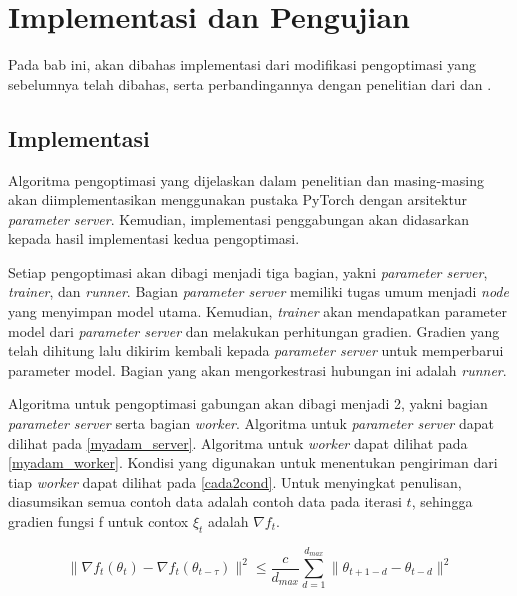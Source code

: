 \chapter{Implementasi dan Pengujian}

Pada bab ini, akan dibahas implementasi dari modifikasi pengoptimasi yang sebelumnya telah dibahas, serta perbandingannya dengan penelitian dari \textcite{Chen2022Efficient} dan \textcite{Chen2021CADA}.

\section{Implementasi}
Algoritma pengoptimasi yang dijelaskan dalam penelitian \textcite{Chen2022Efficient} dan \textcite{Chen2021CADA} masing-masing akan diimplementasikan menggunakan pustaka PyTorch dengan arsitektur \emph{parameter server}. Kemudian, implementasi penggabungan akan didasarkan kepada hasil implementasi kedua pengoptimasi.

Setiap pengoptimasi akan dibagi menjadi tiga bagian, yakni \emph{parameter server}, \emph{trainer}, dan \emph{runner}. Bagian \emph{parameter server} memiliki tugas umum menjadi \emph{node} yang menyimpan model utama. Kemudian, \emph{trainer} akan mendapatkan parameter model dari \emph{parameter server} dan melakukan perhitungan gradien. Gradien yang telah dihitung lalu dikirim kembali kepada \emph{parameter server} untuk memperbarui parameter model. Bagian yang akan mengorkestrasi hubungan ini adalah \emph{runner}.

Algoritma untuk pengoptimasi gabungan akan dibagi menjadi 2, yakni bagian \textit{parameter server} serta bagian \textit{worker}. Algoritma untuk \textit{parameter server} dapat dilihat pada \autoref{myadam_server}. Algoritma untuk \textit{worker} dapat dilihat pada \autoref{myadam_worker}. Kondisi yang digunakan untuk menentukan pengiriman dari tiap \textit{worker} dapat dilihat pada \autoref{cada2cond}. Untuk menyingkat penulisan, diasumsikan semua contoh data adalah contoh data pada iterasi $t$, sehingga gradien fungsi f untuk contox $\xi_t$ adalah $\nabla f_t$.

\begin{equation}
  \label{cada2cond}
  \|\nabla f_t(\theta_t) - \nabla f_t(\theta_{t-\tau})\|^2 \leq \frac{c}{d_{max}} \sum_{d=1}^{d_{max}} \|\theta_{t+1-d} - \theta_{t-d}\|^2
\end{equation}

